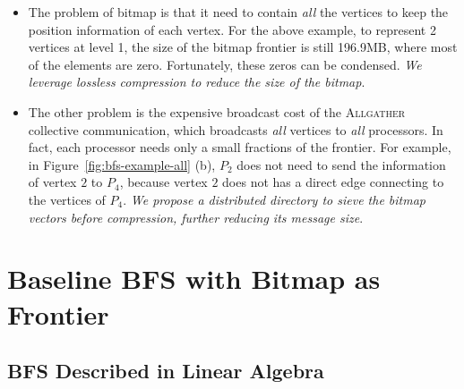 \documentclass[conference]{IEEEtran}
\begin{document}
\begin{itemize}
\item The problem of bitmap is that it need to contain \emph{all} the vertices
  to keep the position information of each vertex. For the above example, to
  represent 2 vertices at level 1, the size of the bitmap frontier is still
  196.9MB, where most of the elements are zero. Fortunately, these zeros can
  be condensed.  \emph{We leverage lossless compression to reduce the size of
    the bitmap}.
\item The other problem is the expensive broadcast cost of the
  \textsc{Allgather} collective communication, which broadcasts \emph{all}
  vertices to \emph{all} processors. In fact, each processor needs only a
  small fractions of the frontier.  For example, in
  Figure~\ref{fig:bfs-example-all} (b), $P_2$ does not need to send the
  information of vertex $2$ to $P_4$, because vertex $2$ does not has a direct
  edge connecting to the vertices of $P_4$.  \emph{We propose a distributed
    directory to sieve the bitmap vectors before compression, further reducing
    its message size}.
\end{itemize}




\section{Baseline BFS with Bitmap as Frontier}
\label{sec:baseline-bfs}

\subsection{BFS Described in Linear Algebra}
\label{sec:preliminary}
\end{document}
